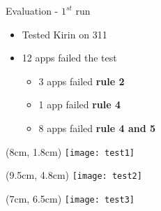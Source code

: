 \begin{frame}{Evaluation - $1^{st}$ run}

\begin{center}
  \begin{itemize}
    \item Tested Kirin on 311

    \vfill

    \item 12 apps failed the test
    \begin{itemize}
    \item 3 apps failed \textbf{rule 2}

    \item 1 app failed \textbf{rule 4}

    \item 8 apps failed \textbf{rule 4 and 5}
    \end{itemize}
  \end{itemize}
\end{center}

\begin{textblock*}{1cm}(8cm, 1.8cm)
    \texttt{[image: test1]}
\end{textblock*}

\begin{textblock*}{1cm}(9.5cm, 4.8cm)
    \texttt{[image: test2]}
\end{textblock*}

\begin{textblock*}{1cm}(7cm, 6.5cm)
    \texttt{[image: test3]}
\end{textblock*}

\end{frame}
